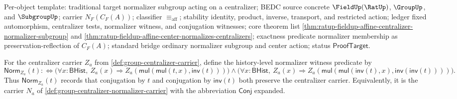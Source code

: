 Per-object template: traditional target normalizer subgroup acting on a
centralizer; BEDC source concrete $\FieldUp(\RatUp)$, $\GroupUp$, and
$\SubgroupUp$; carrier $N_F(C_F(A))$; classifier $\equiv_{\mathrm{aff}}$;
stability identity, product, inverse, transport, and restricted action; ledger
fixed automorphism, centralizer tests, normalizer witness, and conjugation
witnesses; core theorem list
\autoref{thm:ratup-fieldup-affine-centralizer-normalizer-subgroup} and
\autoref{thm:ratup-fieldup-affine-center-normalizes-centralizers}; exactness
predicate normalizer membership as preservation-reflection of $C_F(A)$;
standard bridge ordinary normalizer subgroup and center action; status
$\mathsf{ProofTarget}$.

\begin{definition}
\label{def:subgroup-centralizer-normalizer-witness}
For the centralizer carrier $Z_a$ from
\autoref{def:group-centralizer-carrier}, define the history-level normalizer
witness predicate by
$$
\mathsf{Norm}_{Z_a}(t) :\Longleftrightarrow
\bigl(\forall x:\mathsf{BHist},\ Z_a(x)\Rightarrow
Z_a(\mathsf{mul}(\mathsf{mul}(t,x),\mathsf{inv}(t)))\bigr)
\land
\bigl(\forall x:\mathsf{BHist},\ Z_a(x)\Rightarrow
Z_a(\mathsf{mul}(\mathsf{mul}(\mathsf{inv}(t),x),
\mathsf{inv}(\mathsf{inv}(t))))\bigr).
$$
Thus $\mathsf{Norm}_{Z_a}(t)$ records that conjugation by $t$ and conjugation by
$\mathsf{inv}(t)$ both preserve the centralizer carrier. Equivalently, it is the
carrier $N_a$ of \autoref{def:group-centralizer-normalizer-carrier} with the
abbreviation $\mathsf{Conj}$ expanded.
\end{definition}

